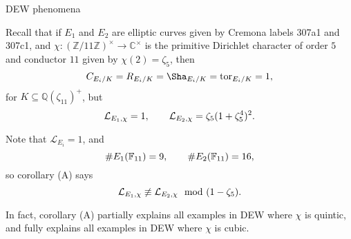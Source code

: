 \documentclass[10pt]{beamer}
\begin{document}
\begin{frame}[t]{DEW phenomena}

Recall that if $ E_1 $ and $ E_2 $ are elliptic curves given by Cremona labels 307a1 and 307c1, and $ \chi : (\mathbb{Z} / 11\mathbb{Z})^\times \to \mathbb{C}^\times $ is the primitive Dirichlet character of order $ 5 $ and conductor $ 11 $ given by $ \chi(2) = \zeta_5 $, then
\vspace{-0.2cm} $$ \vspace{-0.2cm} C_{E_i / K} = R_{E_i / K} = \Sha_{E_i / K} = \mathrm{tor}_{E_i / K} = 1, $$
for $ K \subseteq \mathbb{Q}(\zeta_{11})^+ $, but
\vspace{-0.2cm} $$ \vspace{-0.2cm} \mathcal{L}_{E_1, \chi} = 1, \qquad \mathcal{L}_{E_2, \chi} = \zeta_5(1 + \zeta_5^4)^2. $$

\pause

Note that $ \mathcal{L}_{E_i} = 1 $, and
\vspace{-0.2cm} $$ \vspace{-0.2cm} \#E_1(\mathbb{F}_{11}) = 9, \qquad \#E_2(\mathbb{F}_{11}) = 16, $$
so corollary (A) says
\vspace{-0.2cm} $$ \vspace{-0.2cm} \mathcal{L}_{E_1, \chi} \not\equiv \mathcal{L}_{E_2, \chi} \mod (1 - \zeta_5). $$

\pause

\vspace{0.5cm} In fact, corollary (A) partially explains all examples in DEW where $ \chi $ is quintic, and fully explains all examples in DEW where $ \chi $ is cubic.

\end{frame}
\end{document}
